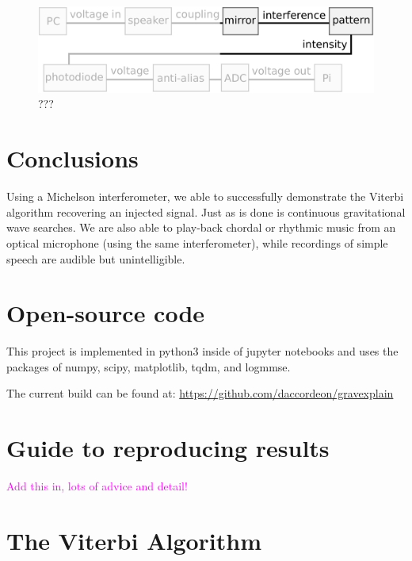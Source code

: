 \documentclass[prb,preprint]{revtex4-1}
\newcommand{\jam}{\textcolor{magenta}}
\begin{document}
\begin{figure}%
	\includegraphics[width=\textwidth]{figures/pipeline_highlighted.pdf}
	\caption{???}
	\label{fig:pipeline_highlighted}
\end{figure}


\section{Conclusions}
\label{sec:conclusions}

Using a Michelson interferometer, we able to successfully demonstrate the Viterbi algorithm recovering an injected signal. Just as is done is continuous gravitational wave searches. We are also able to play-back chordal or rhythmic music from an optical microphone (using the same interferometer), while recordings of simple speech are audible but unintelligible.

\newpage
\appendix

\section{Open-source code}
This project is implemented in python3\cite{python} inside of jupyter notebooks\cite{jupyter}\cite{ipython} and uses the packages of numpy\cite{numpy}, scipy\cite{scipy}, matplotlib\cite{matplotlib}, tqdm\cite{tqdm}, and logmmse\cite{logmmse}.

The current build can be found at:
\url{https://github.com/daccordeon/gravexplain}

\section{Guide to reproducing results}
\label{app:reproducing_results}
\jam{Add this in, lots of advice and detail!}



\section{The Viterbi Algorithm}
\label{app:viterbi}
\end{document}
